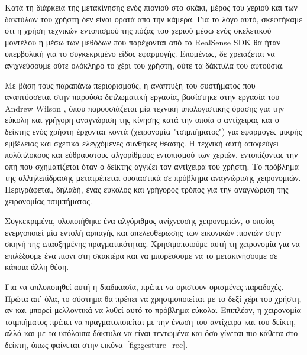 Κατά τη διάρκεια της μετακίνησης ενός πιονιού στο σκάκι, μέρος του χεριού και των δακτύλων του χρήστη δεν είναι ορατά από την κάμερα. Για το λόγο αυτό, σκεφτήκαμε ότι η χρήση τεχνικών εντοπισμού της πόζας του χεριού μέσω ενός σκελετικού μοντέλου ή μέσω των μεθόδων που παρέχονται από το RealSense\texttrademark{} SDK θα ήταν υπερβολική για το συγκεκριμένο είδος εφαρμογής. Επομένως, δε χρειάζεται να ανιχνεύσουμε ούτε ολόκληρο το χέρι του χρήστη, ούτε τα δάκτυλα του αυτούσια. 



Με βάση τους παραπάνω περιορισμούς, η ανάπτυξη του συστήματος που αναπτύσσεται στην παρούσα διπλωματική εργασία, βασίστηκε στην εργασία του Andrew Wilson \cite{Wilson2006}, όπου παρουσιάζεται μία τεχνική υπολογιστικής όρασης για την εύκολη και γρήγορη αναγνώριση της κίνησης κατά την οποία ο αντίχειρας και ο δείκτης ενός χρήστη έρχονται κοντά (χειρονομία "τσιμπήματος") για εφαρμογές μικρής εμβέλειας και σχετικά ελεγχόμενες συνθήκες θέασης. Η τεχνική αυτή αποφεύγει πολύπλοκους και εύθραυστους αλγορίθμους εντοπισμού των χεριών, εντοπίζοντας την οπή που σχηματίζεται όταν ο δείκτης αγγίζει τον αντίχειρα του χρήστη. Το πρόβλημα της αλληλεπίδρασης μετατρέπεται ουσιαστικά σε πρόβλημα αναγνώρισης χειρονομιών. Περιγράφεται, δηλαδή, ένας εύκολος και γρήγορος τρόπος για την αναγνώριση της χειρονομίας τσιμπήματος. 


Συγκεκριμένα, υλοποιήθηκε ένα αλγόριθμος ανίχνευσης χειρονομιών, ο οποίος ενεργοποιεί μία εντολή αρπαγής και απελευθέρωσης των εικονικών πιονιών στην σκηνή της επαυξημένης πραγματικότητας. Χρησιμοποιούμε αυτή τη χειρονομία για να επιλέξουμε ένα πιόνι στη σκακιέρα και να μπορέσουμε να το μετακινήσουμε σε κάποια άλλη θέση.


Για να απλοποιηθεί αυτή η διαδικασία, πρέπει να οριστουν ορισμένες παραδοχές.
Πρώτα απ' όλα, το σύστημα θα πρέπει να χρησιμοποιείται με το δεξί χέρι του χρήστη, αν και μπορεί μελλοντικά να λυθεί αυτό το πρόβλημα εύκολα. Επιπλέον, η χειρονομία τσιμπήματος πρέπει να πραγματοποιείται με την ένωση του αντίχειρα και του δείκτη, αλλά και με τα υπόλοιπα δάκτυλα να είναι τεντωμένα και όσο γίνεται πιο κάθετα στο δείκτη, όπως φαίνεται στην εικόνα~\ref{fig:gesture_rec}.

